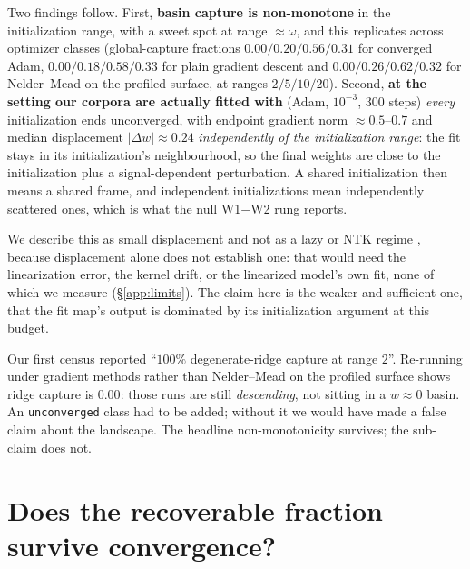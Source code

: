Two findings follow. First, \textbf{basin capture is non-monotone} in the initialization range,
with a sweet spot at range $\approx \omega$, and this replicates across optimizer classes
(global-capture fractions $0.00/0.20/0.56/0.31$ for converged Adam, $0.00/0.18/0.58/0.33$ for
plain gradient descent and $0.00/0.26/0.62/0.32$ for Nelder--Mead on the profiled surface, at
ranges $2/5/10/20$). Second, \textbf{at the setting our corpora are actually fitted with}
(Adam, $10^{-3}$, $300$ steps) \emph{every} initialization ends unconverged, with endpoint
gradient norm $\approx 0.5$--$0.7$ and median displacement $|\Delta w| \approx 0.24$
\emph{independently of the initialization range}: the fit stays in its initialization's
neighbourhood, so the final weights are close to the initialization plus a signal-dependent
perturbation. A shared initialization then means a shared frame, and independent initializations
mean independently scattered ones, which is what the null W1$-$W2 rung reports.

We describe this as small displacement and not as a lazy or NTK regime
\citep{jacot2018ntk,chizat2019lazy}, because displacement alone does not establish one: that would
need the linearization error, the kernel drift, or the linearized model's own fit, none of which we
measure (\S\ref{app:limits}). The claim here is the weaker and sufficient one, that the fit map's output is dominated by its initialization argument at this budget.

\begin{remark}
Our first census reported ``$100\%$ degenerate-ridge capture at range $2$''. Re-running under
gradient methods rather than Nelder--Mead on the profiled surface shows ridge capture is $0.00$:
those runs are still \emph{descending}, not sitting in a $w\approx0$ basin. An
\texttt{unconverged} class had to be added; without it we would have made a false claim about the
landscape. The headline non-monotonicity survives; the sub-claim does not.
\end{remark}


\section{Does the recoverable fraction survive convergence?}\label{app:convergence}

